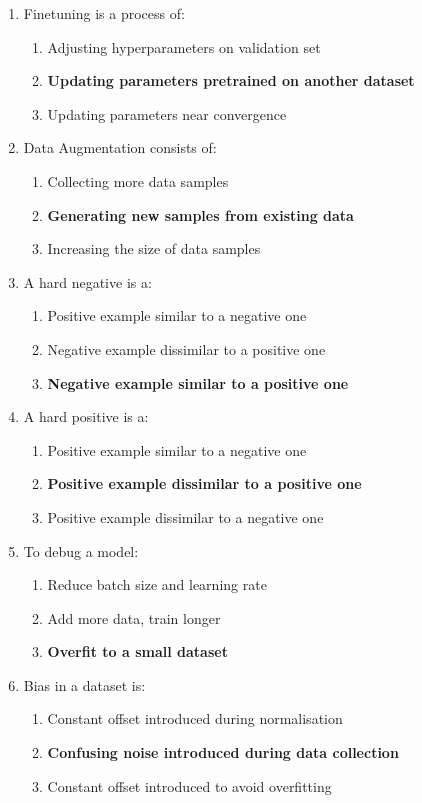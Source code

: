 \documentclass{report}
\numberwithin{equation}{section}
\begin{document}
\begin{enumerate}
\begin{enumerate}[label=\alph*.]
    \end{enumerate}
    \item Finetuning is a process of:
    \begin{enumerate}[label=\alph*.]
        \item Adjusting hyperparameters on validation set
        \item \textbf{Updating parameters pretrained on another dataset}
        \item Updating parameters near convergence
    \end{enumerate}
    \item Data Augmentation consists of:
    \begin{enumerate}[label=\alph*.]
        \item Collecting more data samples
        \item \textbf{Generating new samples from existing data}
        \item Increasing the size of data samples
    \end{enumerate}
    \item A hard negative is a:
    \begin{enumerate}[label=\alph*.]
        \item Positive example similar to a negative one
        \item Negative example dissimilar to a positive one
        \item \textbf{Negative example similar to a positive one}
    \end{enumerate}
    \item A hard positive is a:
    \begin{enumerate}[label=\alph*.]
        \item Positive example similar to a negative one
        \item \textbf{Positive example dissimilar to a positive one}
        \item Positive example dissimilar to a negative one
    \end{enumerate}
    \item To debug a model:
    \begin{enumerate}[label=\alph*.]
        \item Reduce batch size and learning rate
        \item Add more data, train longer
        \item \textbf{Overfit to a small dataset}
    \end{enumerate}
    \item Bias in a dataset is:
    \begin{enumerate}[label=\alph*.]
        \item Constant offset introduced during normalisation
        \item \textbf{Confusing noise introduced during data collection}
        \item Constant offset introduced to avoid overfitting
    \end{enumerate}
\end{enumerate}
\end{document}
